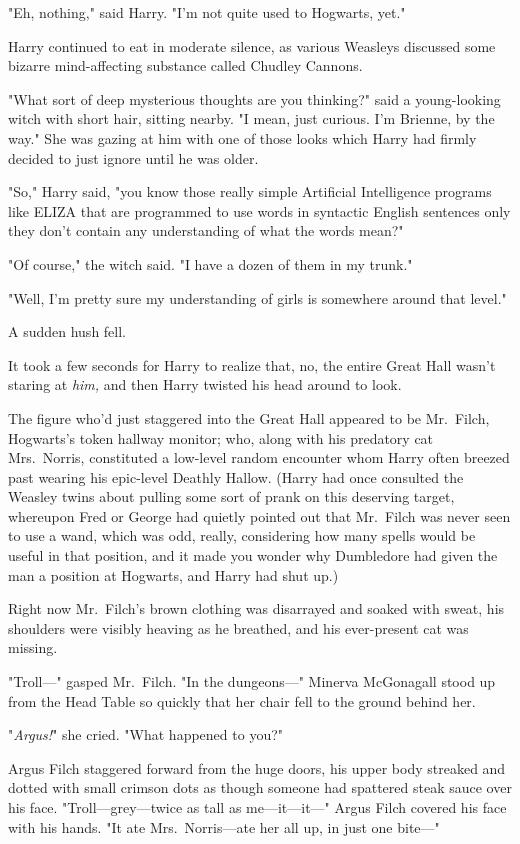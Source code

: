 "Eh, nothing," said Harry. "I'm not quite used to Hogwarts, yet."

Harry continued to eat in moderate silence, as various Weasleys discussed some
bizarre mind-affecting substance called Chudley Cannons.

"What sort of deep mysterious thoughts are you thinking?" said a young-looking
witch with short hair, sitting nearby. "I mean, just curious. I'm Brienne, by
the way." She was gazing at him with one of those looks which Harry had firmly
decided to just ignore until he was older.

"So," Harry said, "you know those really simple Artificial Intelligence
programs like ELIZA that are programmed to use words in syntactic English
sentences only they don't contain any understanding of what the words mean?"

"Of course," the witch said. "I have a dozen of them in my trunk."

"Well, I'm pretty sure my understanding of girls is somewhere around that
level."

A sudden hush fell.

It took a few seconds for Harry to realize that, no, the entire Great Hall
wasn't staring at \emph{him,} and then Harry twisted his head around to look.

The figure who'd just staggered into the Great Hall appeared to be Mr.~Filch,
Hogwarts's token hallway monitor; who, along with his predatory cat
Mrs.~Norris, constituted a low-level random encounter whom Harry often breezed
past wearing his epic-level Deathly Hallow. (Harry had once consulted the
Weasley twins about pulling some sort of prank on this deserving target,
whereupon Fred or George had quietly pointed out that Mr.~Filch was never seen
to use a wand, which was odd, really, considering how many spells would be
useful in that position, and it made you wonder why Dumbledore had given the
man a position at Hogwarts, and Harry had shut up.)

Right now Mr.~Filch's brown clothing was disarrayed and soaked with sweat, his
shoulders were visibly heaving as he breathed, and his ever-present cat was
missing.

"Troll\mbox{---}" gasped Mr.~Filch. "In the dungeons\mbox{---}"
\sbreak
Minerva McGonagall stood up from the Head Table so quickly that her chair fell
to the ground behind her.

"\emph{Argus!}" she cried. "What happened to you?"

Argus Filch staggered forward from the huge doors, his upper body streaked and
dotted with small crimson dots as though someone had spattered steak sauce over
his face. "Troll---grey---twice as tall as me---it---it\mbox{---}" Argus Filch covered
his face with his hands. "It ate Mrs.~Norris---ate her all up, in just one
bite\mbox{---}"

